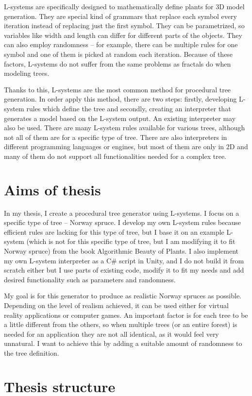 \documentclass[
  digital, %
  table,   %
  nolof,     %
  nolot,     %
]{fithesis3}
\begin{document}
L-systems are specifically designed to mathematically define plants for 3D model generation. They are special kind of grammars that replace each symbol every iteration instead of replacing just the first symbol. They can be parametrized, so variables like width and length can differ for different parts of the objects. They can also employ randomness – for example, there can be multiple rules for one symbol and one of them is picked at random each iteration. Because of these factors, L-systems do not suffer from the same problems as fractals do when modeling trees. \par
Thanks to this, L-systems are the most common method for procedural tree generation. In order apply this method, there are two steps: firstly, developing L-system rules which define the tree and secondly, creating an interpreter that generates a model based on the L-system output. An existing interpreter may also be used. There are many L-system rules available for various trees, although not all of them are for a specific type of tree. There are also interpreters in different programming languages or engines, but most of them are only in 2D and many of them do not support all functionalities needed for a complex tree.
\section{Aims of thesis}
In my thesis, I create a procedural tree generator using L-systems. I focus on a specific type of tree – Norway spruce. I develop my own L-system rules because efficient rules are lacking for this type of tree, but I base it on an example L-system (which is not for this specific type of tree, but I am modifying it to fit Norway spruce) from the book Algorithmic Beauty of Plants. I also implement my own L-system interpreter as a C\# script in Unity, and I do not build it from scratch either but I use parts of existing code, modify it to fit my needs and add desired functionality such as parameters and randomness. \par
My goal is for this generator to produce as realistic Norway spruces as possible. Depending on the level of realism achieved, it can be used either for virtual reality applications or computer games. An important factor is for each tree to be a little different from the others, so when multiple trees (or an entire forest) is needed for an application they are not all identical, as it  would feel very unnatural. I want to achieve this by adding a suitable amount of randomness to the tree definition.
\section{Thesis structure}
\end{document}
